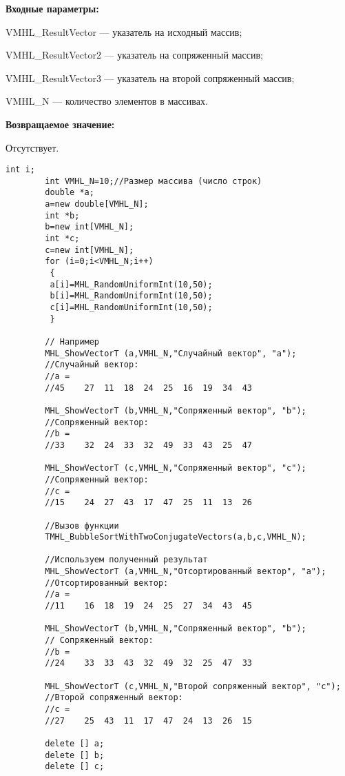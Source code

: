 \documentclass[a4paper,12pt]{article}
\begin{document}
\textbf{Входные параметры:}
 
VMHL\_ResultVector --- указатель на исходный массив;
 
VMHL\_ResultVector2 --- указатель на сопряженный массив;
 
VMHL\_ResultVector3 --- указатель на второй сопряженный массив;
 
VMHL\_N --- количество элементов в массивах.

\textbf{Возвращаемое значение:}

Отсутствует.


\begin{lstlisting}[label=code_use_TMHL_BubbleSortWithTwoConjugateVectors,caption=Пример использования]
        int i;
        int VMHL_N=10;//Размер массива (число строк)
        double *a;
        a=new double[VMHL_N];
        int *b;
        b=new int[VMHL_N];
        int *c;
        c=new int[VMHL_N];
        for (i=0;i<VMHL_N;i++)
         {
         a[i]=MHL_RandomUniformInt(10,50);
         b[i]=MHL_RandomUniformInt(10,50);
         c[i]=MHL_RandomUniformInt(10,50);
         }

        // Например
        MHL_ShowVectorT (a,VMHL_N,"Случайный вектор", "a");
        //Случайный вектор:
        //a =
        //45	27	11	18	24	25	16	19	34	43

        MHL_ShowVectorT (b,VMHL_N,"Сопряженный вектор", "b");
        //Сопряженный вектор:
        //b =
        //33	32	24	33	32	49	33	43	25	47

        MHL_ShowVectorT (c,VMHL_N,"Сопряженный вектор", "c");
        //Сопряженный вектор:
        //c =
        //15	24	27	43	17	47	25	11	13	26

        //Вызов функции
        TMHL_BubbleSortWithTwoConjugateVectors(a,b,c,VMHL_N);

        //Используем полученный результат
        MHL_ShowVectorT (a,VMHL_N,"Отсортированный вектор", "a");
        //Отсортированный вектор:
        //a =
        //11	16	18	19	24	25	27	34	43	45

        MHL_ShowVectorT (b,VMHL_N,"Сопряженный вектор", "b");
        // Сопряженный вектор:
        //b =
        //24	33	33	43	32	49	32	25	47	33

        MHL_ShowVectorT (c,VMHL_N,"Второй сопряженный вектор", "c");
        //Второй сопряженный вектор:
        //c =
        //27	25	43	11	17	47	24	13	26	15

        delete [] a;
        delete [] b;
        delete [] c;
\end{lstlisting}
\end{document}
